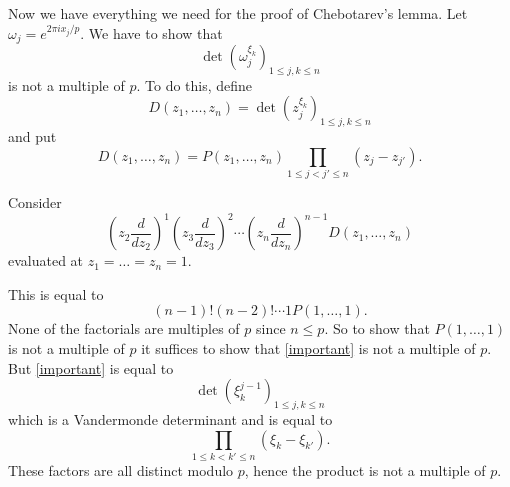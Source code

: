 \documentclass{slides}
\begin{document}
\begin{slide}
Now we have everything we need for the proof of Chebotarev's lemma.
Let $\omega_j=e^{2\pi ix_j/p}$. We have to show that
\[
\det(\omega_j^{\xi_k})_{1\leq j,k \leq n}
\]
is not a multiple of $p$. To do this, define
\[
D(z_1,\ldots,z_n)=\det(z_j^{\xi_k})_{1\leq j,k\leq n}
\]
and put
\[
D(z_1,\ldots,z_n)=P(z_1,\ldots,z_n) \prod_{1 \leq j<j' \leq n}(z_j-z_{j'}).
\]
\end{slide}

Consider
\begin{equation}
\label{important}
(z_2 \frac{d}{dz_2})^1 (z_3 \frac{d}{dz_3})^2 \cdots (z_n \frac{d}{dz_n})^{n-1}
D(z_1,\ldots,z_n)
\end{equation}
evaluated at $z_1=\ldots=z_n=1$.

This is equal to
\[
(n-1)!(n-2)!\cdots 1P(1,\ldots,1).
\]
None of the factorials are multiples of $p$ since $n \leq p$. So to
show that $P(1,\ldots,1)$ is not a multiple of $p$ it suffices to show
that \eqref{important} is not a multiple of $p$. But \eqref{important} 
is equal to
\[
\det(\xi_k^{j-1})_{1 \leq j,k \leq n}
\]
which is a Vandermonde determinant and is equal to 
\[
\prod_{1 \leq k<k' \leq n} (\xi_k-\xi_{k'}).
\]
These factors are all distinct modulo $p$, hence the product is not
a
multiple of $p$.
\end{document}

